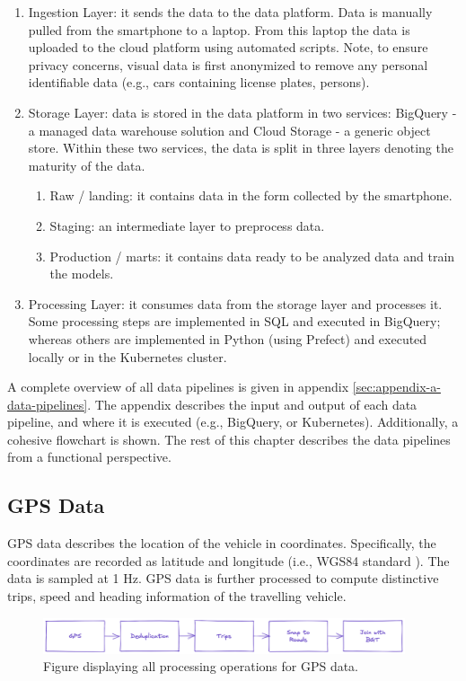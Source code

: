 \begin{enumerate}
\item Ingestion Layer: it sends the data to the data platform. Data is manually pulled from the smartphone to a laptop. From this laptop the data is uploaded to the cloud platform using automated scripts. Note, to ensure privacy concerns, visual data is first anonymized to remove any personal identifiable data (e.g., cars containing license plates, persons).
\item Storage Layer: data is stored in the data platform in two services: BigQuery - a managed data warehouse solution and Cloud Storage - a generic object store. Within these two services, the data is split in three layers denoting the maturity of the data.
\begin{enumerate}
\item Raw / landing: it contains data in the form collected by the smartphone.
\item Staging: an intermediate layer to preprocess data.
\item Production / marts: it contains data ready to be analyzed data and train the models.
\end{enumerate}
\item Processing Layer: it consumes data from the storage layer and processes it. Some processing steps are implemented in SQL and executed in BigQuery; whereas others are implemented in Python (using Prefect) and executed locally or in the Kubernetes cluster.
\end{enumerate}


A complete overview of all data pipelines is given in appendix \ref{sec:appendix-a-data-pipelines}. The appendix describes the input and output of each data pipeline, and where it is executed (e.g., BigQuery, or Kubernetes). Additionally, a cohesive flowchart is shown. The rest of this chapter describes the data pipelines from a functional perspective.

\subsection{GPS Data}
GPS data describes the location of the vehicle in coordinates. Specifically, the coordinates are recorded as latitude and longitude (i.e., WGS84 standard \cite{wgs84}). The data is sampled at 1 Hz. GPS data is further processed to compute distinctive trips, speed and heading information of the travelling vehicle.

\begin{figure}[ht]
\begin{center}
\includegraphics[width=0.95\textwidth,keepaspectratio]{images/4_data/processing-overview-gps.png}
\end{center}
\captionsetup{width=.90\textwidth}
\caption{Figure displaying all processing operations for GPS data.}
\label{fig:processing-overview}
\end{figure}



